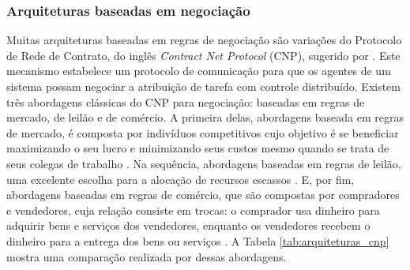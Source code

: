             \subsubsection{Arquiteturas baseadas em negociação} \label{subsec:arch_mercado}
                Muitas arquiteturas baseadas em regras de negociação são variações do Protocolo de Rede de Contrato, do inglês \textit{Contract Net Protocol} (CNP), sugerido por . Este mecanismo estabelece um protocolo de comunicação para que os agentes de um sistema possam negociar a atribuição de tarefa com controle distribuído. Existem três abordagens clássicas do CNP para negociação: baseadas em regras de mercado, de leilão e de comércio. A primeira delas, abordagens baseada em regras de mercado, é composta por indivíduos competitivos cujo objetivo é se beneficiar maximizando o seu lucro e minimizando seus custos mesmo quando se trata de seus colegas de trabalho \cite{ref:zlot2006auction}. Na sequência, abordagens baseadas em regras de leilão, uma excelente escolha para a alocação de recursos escassos \cite{ref:gerkey2002murdoch}. E, por fim, abordagens baseadas em regras de comércio, que são compostas por compradores e vendedores, cuja relação consiste em trocas: o comprador usa dinheiro para adquirir bens e serviços dos vendedores, enquanto os vendedores recebem o dinheiro para a entrega dos bens ou serviços \cite{ref:yan2011trade}. A Tabela \ref{tab:arquiteturas_cnp} mostra uma comparação realizada por  dessas abordagens. 
                
